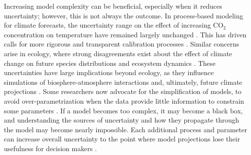 \documentclass[11pt]{article}
\begin{document}
Increasing model complexity can be beneficial, especially when it reduces uncertainty; however, this is not always the outcome. In process-based modeling for climate forecasts, the uncertainty range on the effect of increasing CO$_{2}$ concentration on temperature have remained largely unchanged \citep{Zelinka2020}. This has driven calls for more rigorous and transparent calibration processes \citep{balaji2022general}. Similar concerns arise in ecology, where strong disagreements exist about the effect of climate change on future species distributions \citep{Cheaib2012} and ecosystem dynamics \citep{Lovenduski2017}.
These uncertainties have large implications beyond ecology, as they influence simulations of biosphere-atmosphere interactions and, ultimately, future climate projections \citep{Bonan2018, simpson2025confronting}.
Some researchers now advocate for the simplification of models, to avoid over-parametrization when the data provide little information to constrain some parameters \citep{Wang2017, Harrison2021}. 
If a model becomes too complex, it may become a black box, %
and understanding the sources of uncertainty and how they propagate through the model may become nearly impossible.
Each additional process and parameter can increase overall uncertainty to the point where model projections lose their usefulness for decision makers \citep{Saltelli2020}. 
\end{document}
